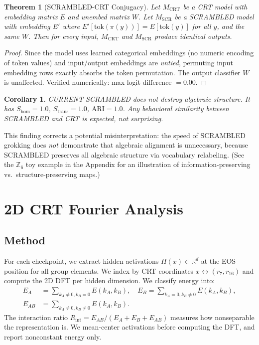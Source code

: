 \documentclass[11pt,a4paper]{article}
\newtheorem{theorem}{Theorem}
\newtheorem{corollary}{Corollary}
\theoremstyle{definition}
\theoremstyle{remark}
\newcommand{\Z}{\mathbb{Z}}
\newcommand{\R}{\mathbb{R}}
\newcommand{\Shom}{S_{\mathrm{hom}}}
\newcommand{\Strans}{S_{\mathrm{trans}}}
\newcommand{\ARI}{\mathrm{ARI}}
\newcommand{\EAB}{E_{AB}}
\newcommand{\EA}{E_A}
\newcommand{\EB}{E_B}
\newcommand{\Rint}{R_{\mathrm{int}}}
\begin{document}
\begin{theorem}[SCRAMBLED-CRT Conjugacy]
\label{thm:conjugacy}
Let $M_{\text{CRT}}$ be a CRT model with embedding matrix $E$ and unembed matrix $W$. Let $M_{\text{SCR}}$ be a SCRAMBLED model with embedding $E'$ where $E'[\text{tok}(\pi(y))] = E[\text{tok}(y)]$ for all $y$, and the same $W$. Then for every input, $M_{\text{CRT}}$ and $M_{\text{SCR}}$ produce identical outputs.
\end{theorem}

\begin{proof}
Since the model uses learned categorical embeddings (no numeric encoding of token values) and input/output embeddings are \emph{untied}, permuting input embedding rows exactly absorbs the token permutation. The output classifier $W$ is unaffected. Verified numerically: max logit difference $= 0.00$.
\end{proof}

\begin{corollary}
CURRENT SCRAMBLED does not destroy algebraic structure. It has $\Shom = 1.0$, $\Strans = 1.0$, $\ARI = 1.0$. Any behavioral similarity between SCRAMBLED and CRT is expected, not surprising.
\end{corollary}

This finding corrects a potential misinterpretation: the speed of SCRAMBLED grokking does \emph{not} demonstrate that algebraic alignment is unnecessary, because SCRAMBLED preserves all algebraic structure via vocabulary relabeling. (See the $\Z_6$ toy example in the Appendix for an illustration of information-preserving vs.\ structure-preserving maps.)

\section{2D CRT Fourier Analysis}
\label{sec:fourier}

\subsection{Method}

For each checkpoint, we extract hidden activations $H(x) \in \R^d$ at the EOS position for all group elements. We index by CRT coordinates $x \leftrightarrow (r_7, r_{16})$ and compute the 2D DFT per hidden dimension. We classify energy into:
\begin{align}
    \EA &= \sum_{k_A \neq 0, k_B = 0} E(k_A, k_B), \quad
    \EB = \sum_{k_A = 0, k_B \neq 0} E(k_A, k_B), \\
    \EAB &= \sum_{k_A \neq 0, k_B \neq 0} E(k_A, k_B).
\end{align}
The interaction ratio $\Rint = \EAB / (\EA + \EB + \EAB)$ measures how nonseparable the representation is. We mean-center activations before computing the DFT, and report nonconstant energy only.
\end{document}
